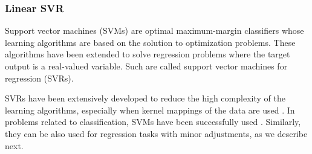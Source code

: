 \documentclass{bmcart}
\begin{document}
\subsubsection*{Linear SVR}
Support vector machines (SVMs) are optimal maximum-margin classifiers whose
learning algorithms are based on the solution to optimization problems. These
algorithms have been extended to solve regression problems where the target
output is a real-valued variable. Such are called support vector machines for
regression (SVRs).

SVRs have been extensively developed to reduce the high complexity of the
learning algorithms, especially when kernel mappings of the data are used
\cite{rivas2014algorithm}. In problems related to classification, SVMs have
been successfully used
\cite{chen2008feature,rakotomamonjy2003variable,chang2008feature}. Similarly,
they can be also used for regression tasks with minor adjustments, as we
describe next.
\end{document}
